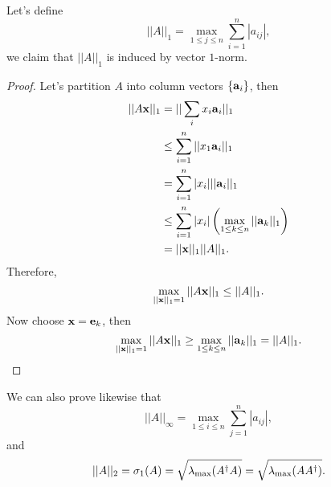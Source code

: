\documentclass{article}
\begin{document}
Let's define 
\begin{equation}
    ||A||_1=\max_{1\leq j\leq n}\sum_{i=1}^n|a_{ij}|,
\end{equation}
we claim that $||A||_1$ is induced by vector $1$-norm.
\begin{proof}
    Let's partition $A$ into column vectors $\{\bm{\mathrm{a}}_i\}$, then
    \begin{align}
        ||A\bm{\mathrm{x}}||_1&=||\sum_ix_i\bm{\mathrm{a}}_i||_1\\
        &\leq\sum_{i=1}^n||x_1\bm{\mathrm{a}}_i||_1\\
        &=\sum_{i=1}^n|x_i|||\bm{\mathrm{a}}_i||_1\\
        &\leq\sum_{i=1}^n|x_i|\left(\max_{1\leq k \leq n}||\bm{\mathrm{a}}_k||_1\right)\\
        &=||\bm{\mathrm{x}}||_1||A||_1.
    \end{align}
    Therefore, 
    \begin{equation}
        \max_{||\bm{\mathrm{x}}||_1=1}||A\bm{\mathrm{x}}||_1\leq ||A||_1.
    \end{equation}
    Now choose $\bm{\mathrm{x}}=\bm{\mathrm{e}}_k$, then
    \begin{equation}
        \max_{||\bm{\mathrm{x}}||_1=1}||A\bm{\mathrm{x}}||_1\geq \max_{1\leq k \leq n}||\bm{\mathrm{a}}_k||_1=||A||_1.
    \end{equation}
\end{proof}

We can also prove likewise that
\begin{equation}
    ||A||_{\infty}=\max_{1\leq i \leq n}\sum_{j=1}^n|a_{ij}|,
\end{equation}
and
\begin{equation}
    ||A||_2=\sigma_1(A)=\sqrt{\lambda_{\mathrm{max}}(A^{\dagger} A)}=\sqrt{\lambda_{\mathrm{max}}(A A^{\dagger})}.
\end{equation}
\end{document}
